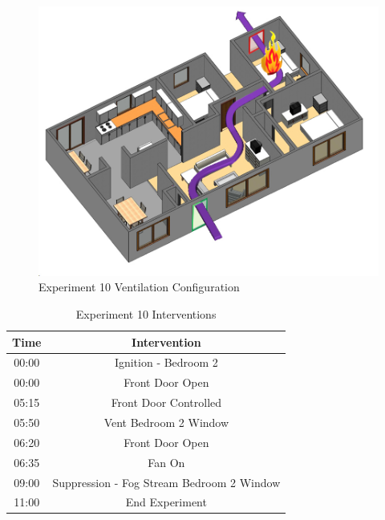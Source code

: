 \documentclass{article}
\begin{document}
\begin{figure}[h!]
	\centering
	\includegraphics[width=5in]{0_Images/FireExperiments/Single_Story/Experiment_10.jpg}
	\caption{Experiment 10 Ventilation Configuration}
	\label{fig:Exp10VentConfig}
\end{figure}

\begin{table}[H]
	\centering
	\caption{Experiment 10 Interventions}
	\begin{tabular}{|c|c|} 
		\hline
		Time & Intervention \\ \hline \hline
		00:00 & Ignition - Bedroom 2 \\ \hline
		00:00 & Front Door Open \\ \hline
		05:15 & Front Door Controlled \\ \hline
		05:50 & Vent Bedroom 2 Window\\ \hline
		06:20 & Front Door Open \\ \hline
		06:35 & Fan On \\ \hline
		09:00 & Suppression - Fog Stream Bedroom 2 Window\\ \hline
		11:00 & End Experiment\\ \hline
	\end{tabular}
	\label{Table:Exp10Interventions}
\end{table}
\end{document}
